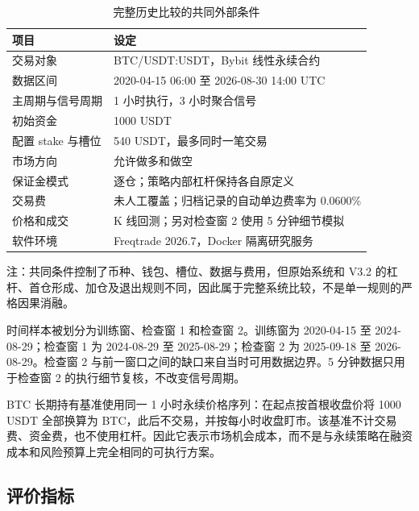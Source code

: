 \begin{table}[H]
  \centering
  \caption{完整历史比较的共同外部条件}
  \label{tab:common-setting}
  \begin{threeparttable}
    \begin{tabularx}{0.92\textwidth}{@{}lY@{}}
      \toprule
      项目 & 设定\\
      \midrule
      交易对象 & BTC/USDT:USDT，Bybit 线性永续合约\\
      数据区间 & 2020-04-15 06:00 至 2026-08-30 14:00 UTC\\
      主周期与信号周期 & 1 小时执行，3 小时聚合信号\\
      初始资金 & 1000 USDT\\
      配置 stake 与槽位 & 540 USDT，最多同时一笔交易\\
      市场方向 & 允许做多和做空\\
      保证金模式 & 逐仓；策略内部杠杆保持各自原定义\\
      交易费 & 未人工覆盖；归档记录的自动单边费率为 0.0600\%\\
      价格和成交 & K 线回测；另对检查窗 2 使用 5 分钟细节模拟\\
      软件环境 & Freqtrade 2026.7，Docker 隔离研究服务\\
      \bottomrule
    \end{tabularx}
    \begin{tablenotes}[flushleft]\footnotesize
      \item 注：共同条件控制了币种、钱包、槽位、数据与费用，但原始系统和 V3.2 的杠杆、首仓形成、加仓及退出规则不同，因此属于完整系统比较，不是单一规则的严格因果消融。
    \end{tablenotes}
  \end{threeparttable}
\end{table}

时间样本被划分为训练窗、检查窗 1 和检查窗 2。训练窗为 2020-04-15 至 2024-08-29；检查窗 1 为 2024-08-29 至 2025-08-29；检查窗 2 为 2025-09-18 至 2026-08-29。检查窗 2 与前一窗口之间的缺口来自当时可用数据边界。5 分钟数据只用于检查窗 2 的执行细节复核，不改变信号周期。

BTC 长期持有基准使用同一 1 小时永续价格序列：在起点按首根收盘价将 1000 USDT 全部换算为 BTC，此后不交易，并按每小时收盘盯市。该基准不计交易费、资金费，也不使用杠杆。因此它表示市场机会成本，而不是与永续策略在融资成本和风险预算上完全相同的可执行方案。

\subsection{评价指标}

